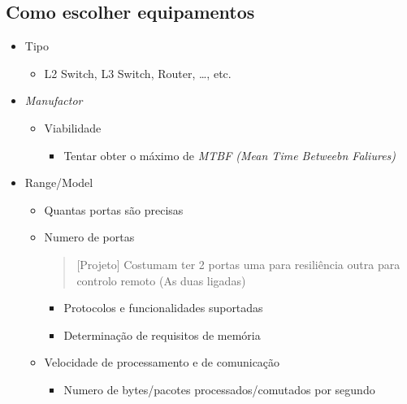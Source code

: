 \documentclass{easyclass}
\begin{document}
\subsection{Como escolher equipamentos}
\begin{itemize}
    \item Tipo
    
    \begin{itemize}
        \item L2 Switch, L3 Switch, Router, \dots, etc.
    \end{itemize}

    \item \textit{Manufactor}
     
    \begin{itemize}
        \item Viabilidade
        \begin{itemize}
            \item Tentar obter o máximo de \textit{MTBF (Mean Time Betweebn Faliures)}
        \end{itemize}
    \end{itemize}

    \item Range/Model
    
    \begin{itemize}
        \item Quantas portas são precisas
        \item Numero de portas
        \begin{quotation}
           [Projeto] Costumam ter 2 portas uma para resiliência outra para controlo remoto (As duas ligadas)
        \end{quotation}

        \begin{itemize}
            \item Protocolos e funcionalidades suportadas
            \item Determinação de requisitos de memória
        \end{itemize}
        \item Velocidade de processamento e de comunicação
        \begin{itemize}
            \item Numero de bytes/pacotes processados/comutados por segundo
        \end{itemize}
    \end{itemize}

\end{itemize}

%
\end{document}
